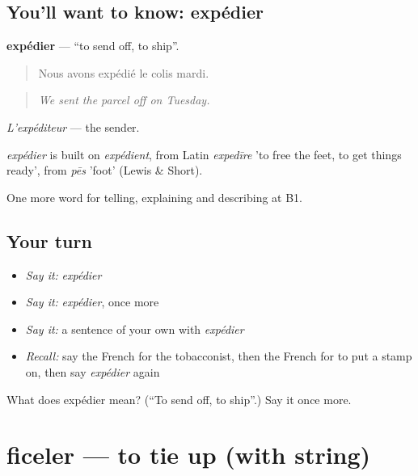 \subsection*{You'll want to know: expédier}
\textbf{expédier} — \textquotedblleft{}to send off, to ship\textquotedblright{}.

\begin{quote}
Nous avons expédié le colis mardi.
\end{quote}

\begin{quote}
\emph{We sent the parcel off on Tuesday.}
\end{quote}

\emph{L'expéditeur} — the sender.

\begin{cousinweb}
\emph{expédier} is built on \emph{expédient}, from Latin \emph{expedīre} 'to free the feet, to get things ready', from \emph{pēs} 'foot' (Lewis \& Short).
\end{cousinweb}

\begin{grammarlens}[title={What you've built}]
One more word for telling, explaining and describing at B1.
\end{grammarlens}

\subsection*{Your turn}
\begin{itemize}
\raggedright
  \item \emph{Say it:} \emph{expédier}
  \item \emph{Say it:} \emph{expédier}, once more
  \item \emph{Say it:} a sentence of your own with \emph{expédier}
  \item \emph{Recall:} say the French for the tobacconist, then the French for to put a stamp on, then say \emph{expédier} again
\end{itemize}

\begin{tcolorbox}[breakable,colback=teal!4,colframe=teal!35!black,title={Before you move on}]
What does expédier mean? (\textquotedblleft{}To send off, to ship\textquotedblright{}.) Say it once more.
\end{tcolorbox}
\section[ficeler]{ficeler — to tie up (with string)}

